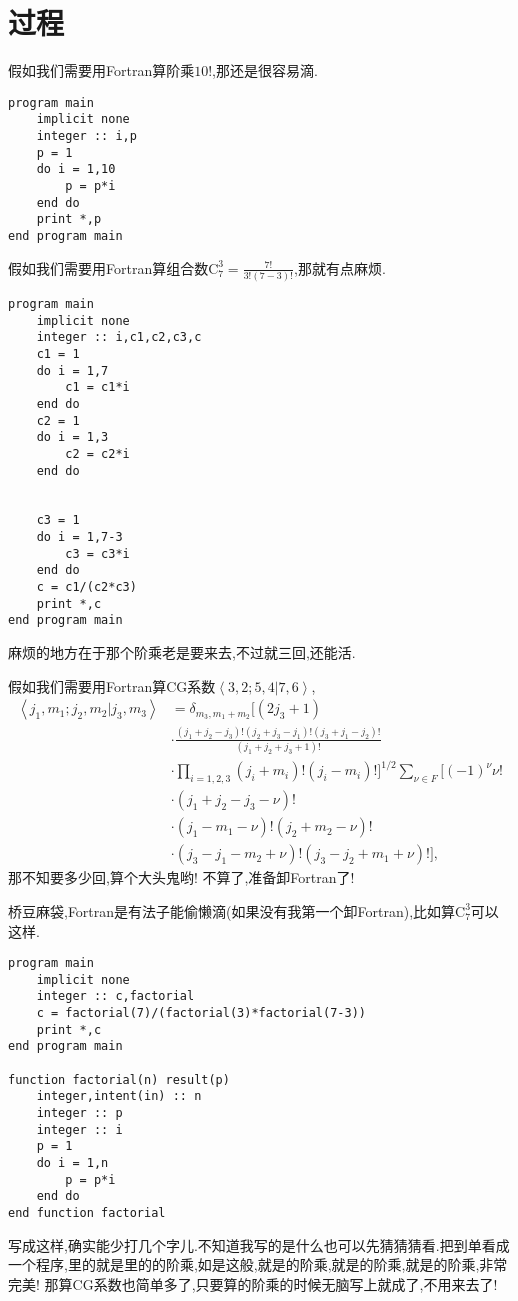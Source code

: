 \chapter{过程}\label{fortran_procedure}

假如我们需要用Fortran算阶乘$10!$,那还是很容易滴.
\begin{lstlisting}
program main
    implicit none
    integer :: i,p
    p = 1
    do i = 1,10
        p = p*i
    end do
    print *,p
end program main
\end{lstlisting}

假如我们需要用Fortran算组合数$\text{C}_7^3=\frac{7!}{3!(7-3)!}$,那就有点麻烦.
\begin{lstlisting}
program main
    implicit none
    integer :: i,c1,c2,c3,c
    c1 = 1
    do i = 1,7
        c1 = c1*i
    end do
    c2 = 1
    do i = 1,3
        c2 = c2*i
    end do


    c3 = 1
    do i = 1,7-3
        c3 = c3*i
    end do
    c = c1/(c2*c3)
    print *,c
end program main
\end{lstlisting}
麻烦的地方在于那个阶乘老是要来去,不过就三回,还能活.

假如我们需要用Fortran算CG系数$\left\langle 3,2;5,4|7,6\right\rangle $,
\begin{align*}
    \left\langle j_1,m_1;j_2,m_2|j_3,m_3\right\rangle&=\delta_{m_3,m_1+m_2}\Big[(2j_3+1)\\
    &\cdot\frac{(j_1+j_2-j_3)!(j_2+j_3-j_1)!(j_3+j_1-j_2)!}{(j_1+j_2+j_3+1)!}
    \\
    &\cdot\prod_{i=1,2,3}(j_i+m_i)!(j_i-m_i)!\Big]^{1/2}\sum_{\nu\in F}[(-1)^{\nu}\nu!\\
    &\cdot(j_1+j_2-j_3-\nu)!\\
    &\cdot(j_1-m_1-\nu)!(j_2+m_2-\nu)!\\
    &\cdot(j_3-j_1-m_2+\nu)!(j_3-j_2+m_1+\nu)!],
\end{align*}
那不知要多少回,算个大头鬼哟! 不算了,准备卸Fortran了!

桥豆麻袋,Fortran是有法子能偷懒滴(如果没有我第一个卸Fortran),比如算$\text{C}_7^3$可以这样.
\begin{lstlisting}
program main
    implicit none
    integer :: c,factorial
    c = factorial(7)/(factorial(3)*factorial(7-3))
    print *,c
end program main

function factorial(n) result(p)
    integer,intent(in) :: n
    integer :: p
    integer :: i 
    p = 1
    do i = 1,n
        p = p*i
    end do
end function factorial
\end{lstlisting}
写成这样,确实能少打几个字儿.不知道我写的是什么也可以先猜猜猜看.把到单看成一个程序,里的就是里的的阶乘,如是这般,就是的阶乘,就是的阶乘,就是的阶乘,非常完美! 那算CG系数也简单多了,只要算的阶乘的时候无脑写上就成了,不用来去了!

